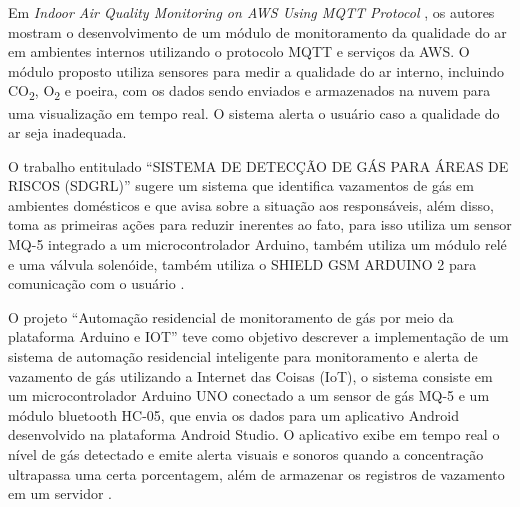 Em \textit{Indoor Air Quality Monitoring on AWS Using MQTT Protocol} \cite{iot-monitoring-on-aws}, os autores mostram o desenvolvimento de 
um módulo de monitoramento da qualidade do ar em ambientes internos utilizando o protocolo MQTT e serviços da AWS. O módulo 
proposto utiliza sensores para medir a qualidade do ar interno, incluindo CO\textsubscript{2}, O\textsubscript{2} e poeira, com os dados sendo enviados e armazenados na 
nuvem para uma visualização em tempo real. O sistema alerta o usuário caso a qualidade do ar seja inadequada. 

O trabalho entitulado ``SISTEMA DE DETECÇÃO DE GÁS PARA ÁREAS DE RISCOS (SDGRL)'' sugere um  sistema que identifica vazamentos de gás em ambientes 
domésticos e que avisa sobre a situação aos responsáveis, além disso, toma as primeiras ações para reduzir inerentes ao fato, para isso utiliza um sensor 
MQ-5 integrado a um microcontrolador Arduino, também utiliza um módulo relé e uma válvula solenóide, também utiliza o SHIELD GSM ARDUINO 2 para comunicação com o usuário \cite{sistema-deteccao}. 

O projeto ``Automação residencial de monitoramento de gás por meio da plataforma Arduino e IOT'' teve como objetivo descrever a implementação de um sistema de automação residencial 
inteligente para monitoramento e alerta de vazamento de gás utilizando a Internet das Coisas (IoT), o sistema consiste em um microcontrolador Arduino UNO conectado a um sensor de gás MQ-5 e um 
módulo bluetooth HC-05, que envia os dados para um aplicativo Android desenvolvido na plataforma Android Studio. O aplicativo exibe em tempo real o nível de gás detectado e emite alerta visuais e 
sonoros quando a concentração ultrapassa uma certa porcentagem, além de armazenar os registros de vazamento em um servidor \cite{alexandre-automaccao-formulas-de-leitura-sensor}.